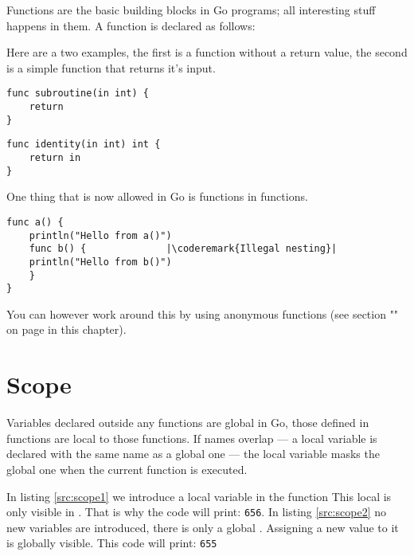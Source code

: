 
\noindent{}Functions are the basic building blocks in Go programs; all interesting
stuff happens in them. A function is declared as follows:

\showremarks
Here are a two examples, the first is a function without a return value,
the second is a simple function that returns it's input.
\begin{lstlisting}
func subroutine(in int) {
    return
}
\end{lstlisting}
\begin{lstlisting}
func identity(in int) int {
    return in
}
\end{lstlisting}
One thing that is now allowed in Go is functions in functions. 
\begin{lstlisting}
func a() {
    println("Hello from a()")
    func b() {			    |\coderemark{Illegal nesting}|
	println("Hello from b()")    
    }
}
\end{lstlisting}
You can however
work around this by using anonymous functions (see section
"" on page \pageref{sec:functions as values} 
in this chapter).

\section{Scope}
Variables declared outside any functions are global in Go, those
defined in functions are local to those functions. If names overlap --- a
local variable is declared with the same name as a global one --- the
local variable masks the global one when the current function is
executed.
\begin{minipage}{.5\textwidth}

\hfill
\vfill
\end{minipage}
\begin{minipage}{.5\textwidth}

\hfill
\vfill
\end{minipage}

In listing \ref{src:scope1} we introduce a local variable 
in the function 
This local  is only visible in . That is
why the code will print: \texttt{656}.
In listing \ref{src:scope2} no new variables are introduced, there
is only a global .
Assigning a new value to it is globally visible. This code will
print: \texttt{655}

